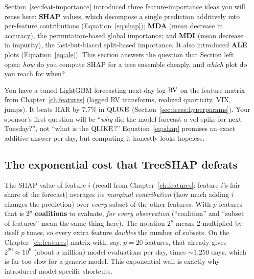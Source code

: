 \begin{prereq}
Section~\ref{sec:feat-importance} introduced three feature-importance ideas
you will reuse here: \textbf{SHAP} values, which decompose a single
prediction additively into per-feature contributions
(Equation~\ref{eq:shap}); \textbf{MDA} (mean decrease in accuracy), the
permutation-based global importance; and \textbf{MDI} (mean decrease in
impurity), the fast-but-biased split-based importance.  It also introduced
\textbf{ALE} plots (Equation~\ref{eq:ale}).  This section answers the
question that Section left open: \emph{how} do you compute SHAP for a tree
ensemble cheaply, and \emph{which} plot do you reach for when?
\end{prereq}

You have a tuned LightGBM forecasting next-day log-$\operatorname{RV}$ on the feature
matrix from Chapter~\ref{ch:features} (lagged RV transforms, realized
quarticity, VIX, jumps).  It beats HAR by 7.7\% in $\operatorname{QLIKE}$
(Section~\ref{sec:trees:hyperparams}).  Your sponsor's first question will be
``\emph{why} did the model forecast a vol spike for next Tuesday?'', not
``what is the $\operatorname{QLIKE}$?''  Equation~\ref{eq:shap} promises an exact additive answer
per day, but computing it honestly looks hopeless.

\subsection{The exponential cost that TreeSHAP defeats}

The SHAP value of feature $i$ (recall from Chapter~\ref{ch:features}: feature
$i$'s fair share of the forecast) averages its \emph{marginal contribution}
(how much adding $i$ changes the prediction) over \emph{every} subset of the
other features.  With $p$ features that is $2^p$ \textbf{coalitions} to
evaluate, \emph{for every observation} (``coalition'' and ``subset of
features'' mean the same thing here).  The notation $2^p$ means $2$
multiplied by itself $p$ times, so every extra feature \emph{doubles} the
number of subsets.  On the Chapter~\ref{ch:features} matrix with, say,
$p = 20$ features, that already gives $2^{20} \approx 10^6$ (about a million)
model evaluations per day, times $\sim$1{,}250 days, which is
far too slow for a generic model.  This exponential wall is exactly why
\citet{Lundberg2017} introduced model-specific shortcuts.

